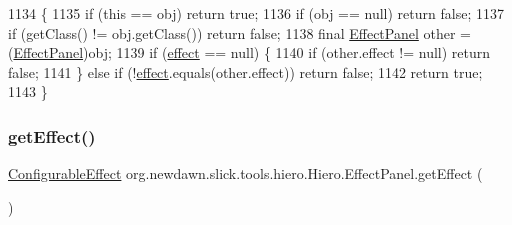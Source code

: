 \begin{DoxyCode}
1134                                            \{
1135             \textcolor{keywordflow}{if} (\textcolor{keyword}{this} == obj) \textcolor{keywordflow}{return} \textcolor{keyword}{true};
1136             \textcolor{keywordflow}{if} (obj == null) \textcolor{keywordflow}{return} \textcolor{keyword}{false};
1137             \textcolor{keywordflow}{if} (getClass() != obj.getClass()) \textcolor{keywordflow}{return} \textcolor{keyword}{false};
1138             \textcolor{keyword}{final} \mbox{\hyperlink{classorg_1_1newdawn_1_1slick_1_1tools_1_1hiero_1_1_hiero_1_1_effect_panel_a63dc8aab0304f670f9425430b8add78e}{EffectPanel}} other = (\mbox{\hyperlink{classorg_1_1newdawn_1_1slick_1_1tools_1_1hiero_1_1_hiero_1_1_effect_panel_a63dc8aab0304f670f9425430b8add78e}{EffectPanel}})obj;
1139             \textcolor{keywordflow}{if} (\mbox{\hyperlink{classorg_1_1newdawn_1_1slick_1_1tools_1_1hiero_1_1_hiero_1_1_effect_panel_a57287dac230d74e637ffe17f55736869}{effect}} == null) \{
1140                 \textcolor{keywordflow}{if} (other.effect != null) \textcolor{keywordflow}{return} \textcolor{keyword}{false};
1141             \} \textcolor{keywordflow}{else} \textcolor{keywordflow}{if} (!\mbox{\hyperlink{classorg_1_1newdawn_1_1slick_1_1tools_1_1hiero_1_1_hiero_1_1_effect_panel_a57287dac230d74e637ffe17f55736869}{effect}}.equals(other.effect)) \textcolor{keywordflow}{return} \textcolor{keyword}{false};
1142             \textcolor{keywordflow}{return} \textcolor{keyword}{true};
1143         \}
\end{DoxyCode}
\mbox{\label{classorg_1_1newdawn_1_1slick_1_1tools_1_1hiero_1_1_hiero_1_1_effect_panel_a4c5d7a640d69c0e376efba917a6b337b}} 
\subsubsection{\texorpdfstring{get\+Effect()}{getEffect()}}
{\footnotesize\ttfamily \mbox{\hyperlink{interfaceorg_1_1newdawn_1_1slick_1_1font_1_1effects_1_1_configurable_effect}{Configurable\+Effect}} org.\+newdawn.\+slick.\+tools.\+hiero.\+Hiero.\+Effect\+Panel.\+get\+Effect (\begin{DoxyParamCaption}{ }\end{DoxyParamCaption})\hspace{0.3cm}{\ttfamily [inline]}}


